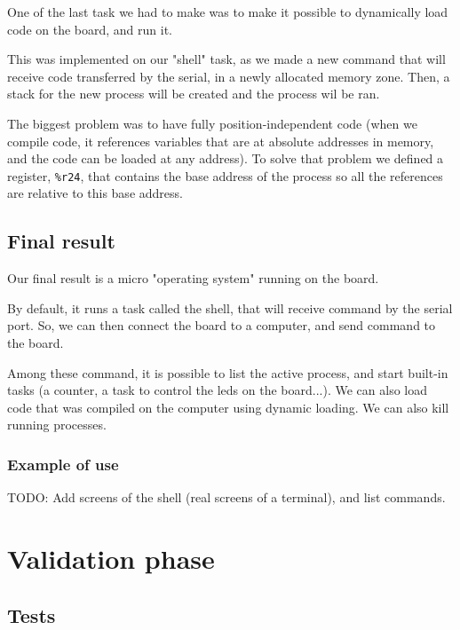 \documentclass[openany, a4paper]{book}
\begin{document}
        One of the last task we had to make was to make it possible to
        dynamically load code on the board, and run it.

        This was implemented on our "shell" task, as we made a new command that
        will receive code transferred by the serial, in a newly allocated
        memory zone.  Then, a stack for the new process will be created and the
        process wil be ran.

        The biggest problem was to have fully position-independent code (when
        we compile code, it references variables that are at absolute addresses
        in memory, and the code can be loaded at any address). To solve that
        problem we defined a register, \verb+%r24+, that contains the base
        address of the process so all the references are relative to this base
        address.

    \section{Final result}
      Our final result is a micro "operating system" running on the board.
      
      By default, it runs a task called the shell, that will receive command by
      the serial port.  So, we can then connect the board to a computer, and
      send command to the board.
        
      Among these command, it is possible to list the active process, and start
      built-in tasks (a counter, a task to control the leds on the board...).
      We can also load code that was compiled on the computer using dynamic
      loading. We can also kill running processes.

      \subsection{Example of use}

      TODO: Add screens of the shell (real screens of a terminal), and list commands.

  \chapter{Validation phase}

    \section{Tests}
\end{document}

